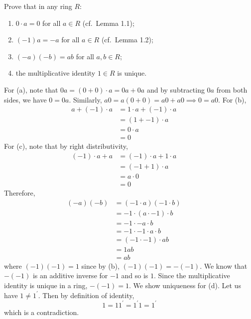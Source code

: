   \begin{exercise}[Shifrin 1.4.6.b/c/d]
    Prove that in any ring $R$:
    \begin{enumerate}
      \item $0 \cdot a = 0$ for all $a \in R$ (cf.\ Lemma 1.1);
      \item $(-1)a = -a$ for all $a \in R$ (cf.\ Lemma 1.2);
      \item $(-a)(-b) = ab$ for all $a,b \in R$;
      \item the multiplicative identity $1 \in R$ is unique.
    \end{enumerate}
  \end{exercise}
  \begin{solution} 
    For (a), note that $0 a = (0 + 0) \cdot a = 0a + 0a$ and by subtracting $0a$ from both sides, we have $0 = 0a$. Similarly, $a0 = a (0 + 0) = a0 + a0 \implies 0 = a0$. 
    For (b), 
    \begin{align}
      a + (-1) \cdot a & = 1 \cdot a + (-1) \cdot a && \tag{definition of $1$} \\
                       & = (1 + -1) \cdot a && \tag{left distributivity} \\
                       & = 0 \cdot a && \tag{definition of add inverse}\\
                       & = 0 && \tag{From (a)}
    \end{align}
    For (c), note that by right distributivity, 
    \begin{align}
      (-1) \cdot a + a & = (-1) \cdot a + 1 \cdot a && \tag{definition of $1$} \\
                       & = (-1 + 1) \cdot a && \tag{right distributivity} \\
                       & = a \cdot 0 && \tag{definition of add inverse}\\
                       & = 0 && \tag{From (a)}
    \end{align}
    Therefore, 
    \begin{align}
      (-a)(-b) & = (-1 \cdot a) (-1 \cdot b) && \tag{from (b)}\\
               & = -1 \cdot (a \cdot -1) \cdot b && \tag{associativity} \\
               & = -1 \cdot -a \cdot b && \tag{from (b)} \\
               & = -1 \cdot -1 \cdot a \cdot b && \tag{from (b)} \\
               & = (-1 \cdot -1) \cdot ab && \tag{associativity} \\
               & = 1ab && \tag{shown below}\\
               & = ab && \tag{definition of identity}
    \end{align} 
    where $(-1)(-1) = 1$ since by (b), $(-1)(-1) = -(-1)$. We know that $-(-1)$ is an additive inverse for $-1$ and so is $1$. Since the multiplicative identity is unique in a ring, $-(-1) = 1$.  We show uniqueness for (d). Let us have $1 \neq 1^\prime$. Then by definition of identity, 
    \begin{equation}
      1 = 1 1^\prime = 1^\prime 1 = 1^\prime
    \end{equation}
    which is a contradiction. 
  \end{solution}

